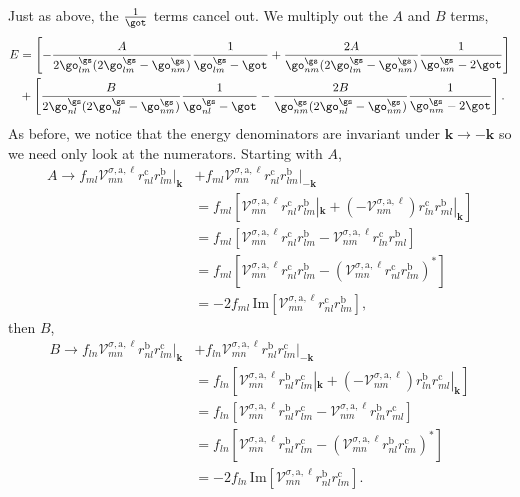 Just as above, the $\frac{1}{\got}$ terms cancel out. We multiply out the 
$A$ and $B$ terms,
\begin{align}\label{emultipied}  
E&=  
\left[
-\frac{A}{2\go^\gs_{lm}(2\go^\gs_{lm}-\go^\gs_{nm})}\frac{1}{\go^\gs_{lm}-\got}
+\frac{2A}{\go^\gs_{nm}(2\go^\gs_{lm}-\go^\gs_{nm})}\frac{1}{\go^\gs_{nm}-2\got}
\right]
\nonumber\\
&+ 
\left[
 \frac{B}{2\go^\gs_{nl}(2\go^\gs_{nl}-\go^\gs_{nm})}\frac{1}{\go^\gs_{nl}-\got}
-\frac{2B}{\go^\gs_{nm}(2\go^\gs_{nl}-\go^\gs_{nm})}\frac{1}{\go^\gs_{nm}-2\got}
\right]
.
\end{align}  
As before, we notice that the energy denominators are invariant under 
$\mathbf{k} \rightarrow - \mathbf{k}$ so we need only look at the numerators.
Starting with $A$,
\begin{align*}
A \rightarrow f_{ml}\mathcal{V}^{\sigma,\text{a},\ell}_{mn}
    r^{\text{c}}_{nl}r^{\text{b}}_{lm}|_{\mathbf{k}}
&+  f_{ml}\mathcal{V}^{\sigma,\text{a},\ell}_{mn}r^{\text{c}}_{nl}
    r^{\text{b}}_{lm}|_{-\mathbf{k}}\nonumber\\
&=  f_{ml}\left[\mathcal{V}^{\sigma,\text{a},\ell}_{mn}
    r^{\text{c}}_{nl}r^{\text{b}}_{lm}|_{\mathbf{k}} 
+   \left(-\mathcal{V}^{\sigma,\text{a},\ell}_{nm}\right)
    r^{\text{c}}_{ln}r^{\text{b}}_{ml}|_{\mathbf{k}}\right]\nonumber\\
&=  f_{ml}\left[\mathcal{V}^{\sigma,\text{a},\ell}_{mn}
    r^{\text{c}}_{nl}r^{\text{b}}_{lm} 
-   \mathcal{V}^{\sigma,\text{a},\ell}_{nm}
    r^{\text{c}}_{ln}r^{\text{b}}_{ml}\right]\nonumber\\
&=  f_{ml}\left[\mathcal{V}^{\sigma,\text{a},\ell}_{mn}
    r^{\text{c}}_{nl}r^{\text{b}}_{lm}
-   \left(\mathcal{V}^{\sigma,\text{a},\ell}_{mn}
    r^{\text{c}}_{nl}r^{\text{b}}_{lm}\right)^*\right]\nonumber\\
&= -2f_{ml}\,\mathrm{Im}\left[\mathcal{V}^{\sigma,\text{a},\ell}_{mn}
    r^{\text{c}}_{nl}r^{\text{b}}_{lm}\right]
,
\end{align*}
then $B$,
\begin{align*}
B \rightarrow f_{ln}\mathcal{V}^{\sigma,\text{a},\ell}_{mn}
    r^{\text{b}}_{nl}r^{\text{c}}_{lm}|_{\mathbf{k}}
&+  f_{ln}\mathcal{V}^{\sigma,\text{a},\ell}_{mn}r^{\text{b}}_{nl}
    r^{\text{c}}_{lm}|_{-\mathbf{k}}\nonumber\\
&=  f_{ln}\left[\mathcal{V}^{\sigma,\text{a},\ell}_{mn}
    r^{\text{b}}_{nl}r^{\text{c}}_{lm}|_{\mathbf{k}} 
+   \left(-\mathcal{V}^{\sigma,\text{a},\ell}_{nm}\right)
    r^{\text{b}}_{ln}r^{\text{c}}_{ml}|_{\mathbf{k}}\right]\nonumber\\
&=  f_{ln}\left[\mathcal{V}^{\sigma,\text{a},\ell}_{mn}
    r^{\text{b}}_{nl}r^{\text{c}}_{lm} 
-   \mathcal{V}^{\sigma,\text{a},\ell}_{nm}
    r^{\text{b}}_{ln}r^{\text{c}}_{ml}\right]\nonumber\\
&=  f_{ln}\left[\mathcal{V}^{\sigma,\text{a},\ell}_{mn}
    r^{\text{b}}_{nl}r^{\text{c}}_{lm}
-   \left(\mathcal{V}^{\sigma,\text{a},\ell}_{mn}
    r^{\text{b}}_{nl}r^{\text{c}}_{lm}\right)^*\right]\nonumber\\
&= -2f_{ln}\,\mathrm{Im}\left[\mathcal{V}^{\sigma,\text{a},\ell}_{mn}
    r^{\text{b}}_{nl}r^{\text{c}}_{lm}\right]
.
\end{align*}
